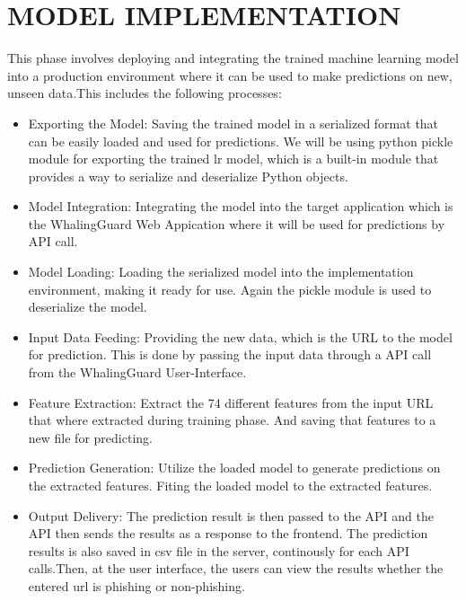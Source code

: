 \section{MODEL IMPLEMENTATION}
\par This phase involves deploying and integrating the trained machine learning model into a production environment where it can be used to make predictions on new, unseen data.This includes the following processes:
\begin{itemize}
\item Exporting the Model: Saving the trained model in a serialized format that can be easily loaded and used for predictions. We will be using python pickle module for exporting the trained lr model, which is a built-in module that provides a way to serialize and deserialize Python objects.
\item Model Integration: Integrating the model into the target application which is the WhalingGuard Web Appication where it will be used for predictions by API call.
\item Model Loading: Loading the serialized model into the implementation environment, making it ready for use. Again the pickle module is used to deserialize the model.
\item Input Data Feeding: Providing the new data, which is the URL to the model for prediction. This is done by passing the input data through a API call from the WhalingGuard User-Interface.
\item Feature Extraction: Extract the 74 different features from the input URL that where extracted during training phase. And saving that features to a new file for predicting.
\item Prediction Generation: Utilize the loaded model to generate predictions on the extracted features. Fiting the loaded model to the extracted features.  
\item Output Delivery: The prediction result is then passed to the API and the API then sends the results as a response to the frontend. The prediction results is also saved in csv file in the server, continously for each API calls.Then, at the user interface, the users can view the results whether the entered url is phishing or non-phishing.
\end{itemize}

